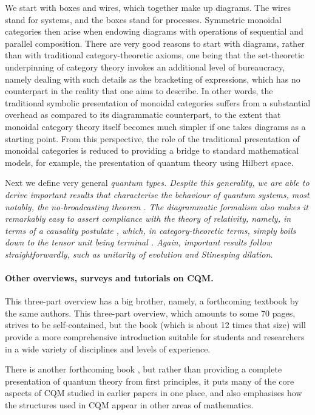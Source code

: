 \documentclass[12pt]{article}
\begin{document}
We start with boxes and wires, which together make up diagrams.  The wires stand for systems, and the boxes stand for processes.  Symmetric monoidal categories then arise when endowing diagrams with operations of sequential and parallel composition. There are very good reasons to start with diagrams, rather than with traditional category-theoretic axioms, one being that the set-theoretic underpinning of category theory invokes an additional level of bureaucracy, namely dealing with such details as the bracketing of expressions, which has no counterpart in the reality that one aims to describe.  In other words, the traditional symbolic presentation of monoidal categories suffers from a substantial overhead as compared to its diagrammatic counterpart, to the extent that  monoidal category theory itself  becomes much simpler if one takes diagrams as  a starting point.  From this perspective, the role of the traditional presentation of  monoidal categories is reduced to providing a bridge to standard mathematical models, for example, the presentation of quantum theory using Hilbert space.

Next we define very general \em quantum types\em.  Despite this generality, we are able to derive important results that characterise the behaviour of quantum systems, most notably, the \em no-broadcasting theorem \em \cite{Nobroadcast}.  The diagrammatic formalism also makes it remarkably easy to assert  compliance with the theory of relativity, namely, in terms of a \em causality postulate \em \cite{chiri1}, which, in category-theoretic terms, simply boils down to the tensor unit being terminal \cite{Cnonsig}.  Again, important results follow straightforwardly, such as \em unitarity of evolution \em and \em Stinesping dilation\em.

\paragraph{Other overviews, surveys and tutorials on CQM.}  This three-part overview %
has a big brother, namely, a forthcoming textbook \cite{CKbook}  by the same authors. This three-part overview,  which amounts to some 70 pages, strives to be self-contained, but the book (which is about 12 times that size) will provide a more comprehensive introduction suitable for students and researchers in a wide variety of disciplines and levels of experience.

There is  another forthcoming book \cite{HVbook}, but rather than providing a complete presentation of quantum theory  from first principles, it puts  many of the core aspects of CQM studied in earlier papers in one place, and  also emphasises how the structures used in CQM  appear in other areas of mathematics.
\end{document}
